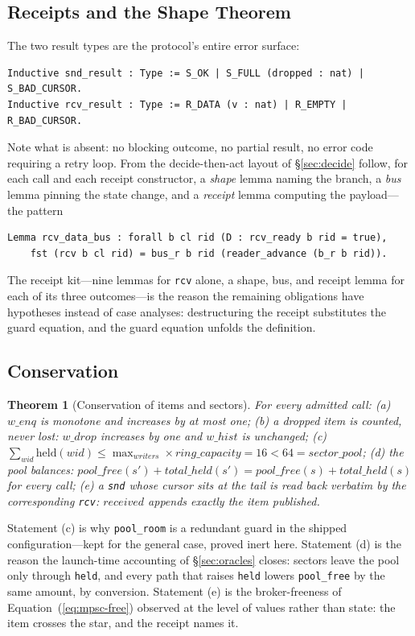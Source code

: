 \documentclass[10pt,journal,compsoc,twocolumn]{article}
\newtheorem{theorem}{Theorem}[section]
\theoremstyle{definition}
\theoremstyle{remark}
\theoremstyle{plain}
\newcommand{\ctr}[1]{\texttt{#1}}
\begin{document}
\subsection{Receipts and the Shape Theorem}
\label{sec:receipts}
The two result types are the protocol's entire error surface:
\begin{lstlisting}[language=Coq]
Inductive snd_result : Type := S_OK | S_FULL (dropped : nat) | S_BAD_CURSOR.
Inductive rcv_result : Type := R_DATA (v : nat) | R_EMPTY | R_BAD_CURSOR.
\end{lstlisting}
Note what is absent: no blocking outcome, no partial result, no error code requiring a retry loop. From the decide-then-act layout of \S\ref{sec:decide} follow, for each call and each receipt constructor, a \emph{shape} lemma naming the branch, a \emph{bus} lemma pinning the state change, and a \emph{receipt} lemma computing the payload---the pattern
\begin{lstlisting}[language=Coq]
Lemma rcv_data_bus : forall b cl rid (D : rcv_ready b rid = true),
    fst (rcv b cl rid) = bus_r b rid (reader_advance (b_r b rid)).
\end{lstlisting}
The receipt kit---nine lemmas for \ctr{rcv} alone, a shape, bus, and receipt lemma for each of its three outcomes---is the reason the remaining obligations have hypotheses instead of case analyses: destructuring the receipt substitutes the guard equation, and the guard equation unfolds the definition.

\subsection{Conservation}
\label{sec:conservation}
\begin{theorem}[Conservation of items and sectors]
\label{thm:conservation}
For every admitted call:
\textup{(a)} \(\mathit{w\_enq}\) is monotone and increases by at most one;
\textup{(b)} a dropped item is counted, never lost: \(\mathit{w\_drop}\) increases by one and \(\mathit{w\_hist}\) is unchanged;
\textup{(c)} \(\sum_{\mathit{wid}} \mathrm{held}(\mathit{wid}) \le \max_{\mathit{writers}} \times \mathit{ring\_capacity} = 16 < 64 = \mathit{sector\_pool}\);
\textup{(d)} the pool balances: \(\mathit{pool\_free}(s') + \mathit{total\_held}(s') = \mathit{pool\_free}(s) + \mathit{total\_held}(s)\) for every call;
\textup{(e)} a \ctr{snd} whose cursor sits at the tail is read back verbatim by the corresponding \ctr{rcv}: \(\mathit{received}\) appends exactly the item published.
\end{theorem}
Statement (c) is why \ctr{pool\_room} is a redundant guard in the shipped configuration---kept for the general case, proved inert here. Statement (d) is the reason the launch-time accounting of \S\ref{sec:oracles} closes: sectors leave the pool only through \ctr{held}, and every path that raises \ctr{held} lowers \ctr{pool\_free} by the same amount, by conversion. Statement (e) is the broker-freeness of Equation~(\ref{eq:mpsc-free}) observed at the level of values rather than state: the item crosses the star, and the receipt names it.
\end{document}
